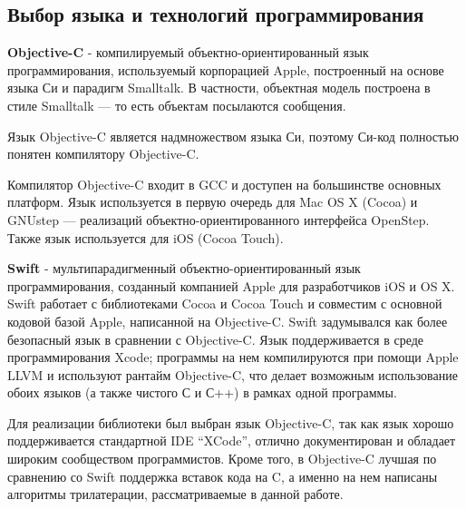 \subsection{Выбор языка и технологий программирования}

\textbf{Objective-C} - компилируемый объектно-ориентированный язык программирования, используемый корпорацией Apple, построенный на основе языка Си и парадигм Smalltalk. В частности, объектная модель построена в стиле Smalltalk — то есть объектам посылаются сообщения.

Язык Objective-C является надмножеством языка Си, поэтому Си-код полностью понятен компилятору Objective-C.

Компилятор Objective-C входит в GCC и доступен на большинстве основных платформ. Язык используется в первую очередь для Mac OS X (Cocoa) и GNUstep — реализаций объектно-ориентированного интерфейса OpenStep. Также язык используется для iOS (Cocoa Touch).

\textbf{Swift} - мультипарадигменный объектно-ориентированный язык программирования, созданный компанией Apple для разработчиков iOS и OS X. Swift работает с библиотеками Cocoa и Cocoa Touch и совместим с основной кодовой базой Apple, написанной на Objective-C. Swift задумывался как более безопасный язык в сравнении с Objective-C. Язык поддерживается в среде программирования Xcode; программы на нем компилируются при помощи Apple LLVM и используют рантайм Objective-C, что делает возможным использование обоих языков (а также чистого С и С++) в рамках одной программы.

Для реализации библиотеки был выбран язык Objective-C, так как язык хорошо поддерживается стандартной IDE “XCode”, отлично документирован и обладает широким сообществом программистов. Кроме того, в Objective-C лучшая по сравнению со Swift поддержка вставок кода на C, а именно на нем написаны алгоритмы трилатерации, рассматриваемые в данной работе.